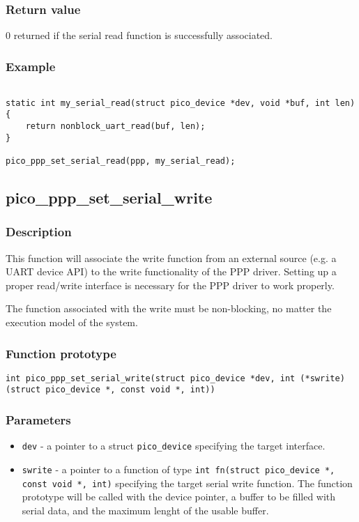 \subsubsection*{Return value}
0 returned if the serial read function is successfully associated.

\subsubsection*{Example}
\begin{verbatim}

static int my_serial_read(struct pico_device *dev, void *buf, int len)
{
    return nonblock_uart_read(buf, len);
}

pico_ppp_set_serial_read(ppp, my_serial_read);
\end{verbatim}

\subsection{pico\_ppp\_set\_serial\_write}
\subsubsection*{Description}
This function will associate the write function from an external source (e.g. a UART device API)
to the write functionality of the PPP driver. Setting up a proper read/write interface is necessary
for the PPP driver to work properly.

The function associated with the write must be non-blocking, no matter the execution model of the system.

\subsubsection*{Function prototype}
\texttt{int pico\_ppp\_set\_serial\_write(struct pico\_device *dev, int (*swrite)(struct pico\_device *, const void *, int))}

\subsubsection*{Parameters}
\begin{itemize}[noitemsep]
\item \texttt{dev} - a pointer to a struct \texttt{pico\_device} specifying the target interface.
\item \texttt{swrite} - a pointer to a function of type \texttt{int fn(struct pico\_device *, const void *, int)} 
    specifying the target serial write function. The function prototype will be called with the device pointer,
    a buffer to be filled with serial data, and the maximum lenght of the usable buffer.
\end{itemize}

